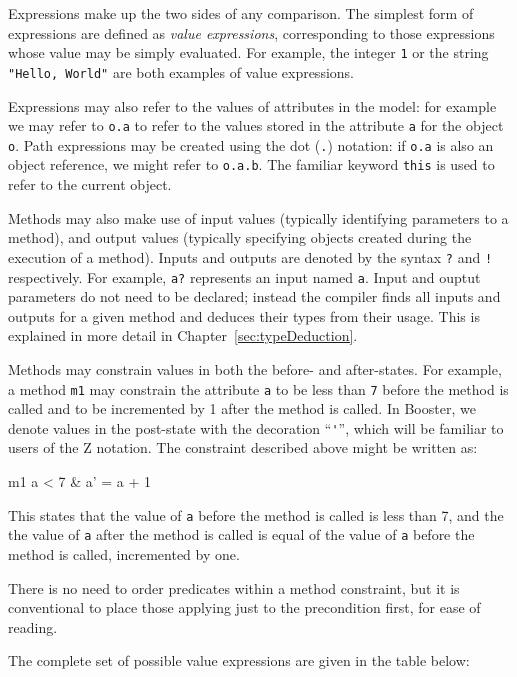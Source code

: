 Expressions make up the two sides of any comparison.  The simplest
form of expressions are defined as \emph{value expressions},
corresponding to those expressions whose value may be simply
evaluated.  For example, the integer \verb|1| or the string
\verb|"Hello, World"| are both examples of value expressions.

Expressions may also refer to the values of attributes in the model:
for example we may refer to \verb|o.a| to
refer to the values stored in the attribute \verb|a| for the object
\verb|o|.  Path expressions may be created using the dot (\verb|.|)
notation: if \verb|o.a| is also an object reference, we might refer to
\verb|o.a.b|.  The familiar keyword \verb|this| is used to refer to
the current object.

Methods may also make use of input values (typically identifying
parameters to a method), and output values (typically specifying
objects created during the execution of a method).  Inputs and
outputs are denoted by the syntax \verb|?| and \verb|!| respectively.
For example, \verb|a?| represents an input named \verb|a|.  Input and
ouptut parameters do not need to be declared; instead the compiler
finds all inputs and outputs for a given method and deduces their
types from their usage.  This is explained in more detail in
Chapter~\ref{sec:typeDeduction}.

Methods may constrain values in both the before- and after-states.
For example, a method \verb|m1| may constrain the attribute \verb|a|
to be less than \verb|7| before the method is called and to be
incremented by 1 after the method is called.  In Booster, we denote
values in the post-state with the decoration ``\verb|'|'', which will
be familiar to users of the Z notation.  The constraint described
above might be written as:

\begin{code}
  m1 { a < 7 & a' = a + 1 }
\end{code}

This states that the value of \verb|a| before the
method is called is less than 7, and the the value of \verb|a| after
the method is called is equal of the value of \verb|a| before the
method is called, incremented by one.

There is no need to order predicates within a method constraint, but
it is conventional to place those applying just to the precondition
first, for ease of reading.

The complete set of possible value expressions are given in the table
below:

